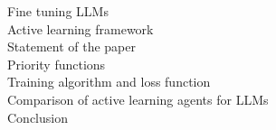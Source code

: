 \documentclass[preview]{standalone}
\begin{document}
Fine tuning LLMs\\Active learning framework\\Statement of the paper\\Priority functions\\Training algorithm and loss function\\Comparison of active learning agents for LLMs\\Conclusion\\
\end{document}

